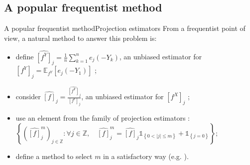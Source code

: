 \documentclass[10pt]{beamer}
\begin{document}
\subsection{A popular frequentist method}


\begin{frame}{A popular frequentist method}{Projection estimators}
From a frequentist point of view, a natural method to answer this problem is:

\bigskip

\begin{itemize}
\setlength\itemsep{2em}
\item<1-> define $\widehat{\left[f^{Y}\right]}_{j} = \frac{1}{n} \sum_{k = 1}^{n} e_{j}(-Y_{k})$, an unbiased estimator for $\left[f^{Y}\right]_{j} = \mathbb{E}_{f^{Y}}\left[e_{j}\left(-Y_{1}\right)\right]$ ;
\item<2-> consider $\widehat{\left[f\right]}_{j} = \frac{\widehat{\left[f^{Y}\right]}_{j}}{\left[f^{\epsilon}\right]_{j}}$, an unbiased estimator for $\left[f^{X}\right]_{j}$ ;
\item<3-> use an element from the family of projection estimators : $\left\{\left(\widehat{\left[f\right]}^{m}_{j}\right)_{j \in \mathbb{Z}} : \forall j \in \mathbb{Z}, \quad \widehat{\left[f\right]}^{m}_{j} = \widehat{\left[f\right]}_{j} \mathds{1}_{\left\{0 < \vert j \vert \leq m\right\}} + \mathds{1}_{\left\{j = 0\right\}} \right\};$
\item<4-> define a method to select $m$ in a satisfactory way (e.g. \citet{PM}).
\end{itemize}

\end{frame}

%
\end{document}
